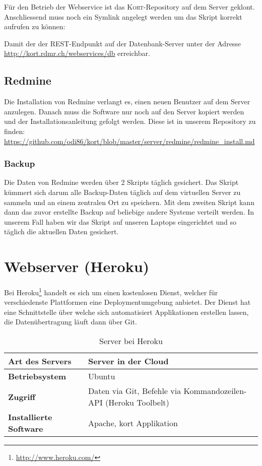 Für den Betrieb der Webservice ist das \textsc{Kort}-Repository auf dem Server geklont.
Anschliessend muss noch ein Symlink angelegt werden um das Skript korrekt aufrufen zu können:


Damit der der REST-Endpunkt auf der Datenbank-Server unter der Adresse \url{http://kort.rdmr.ch/webservices/db} erreichbar.

\subsection{Redmine}
Die Installation von Redmine verlangt es, einen neuen Benutzer  auf dem Server anzulegen.
Danach muss die Software nur noch auf den Server kopiert werden und der Installationsanleitung gefolgt werden.
Diese ist in unserem Repository zu finden: \url{https://github.com/odi86/kort/blob/master/server/redmine/redmine_install.md}

\subsubsection{Backup}
Die Daten von Redmine werden über 2 Skripts täglich gesichert. 
Das Skript  kümmert sich darum alle Backup-Daten täglich auf dem virtuellen Server zu sammeln und an einem zentralen Ort zu speichern.
Mit dem zweiten Skript  kann dann das zuvor erstellte Backup auf beliebige andere Systeme verteilt werden.
In unserem Fall haben wir das Skript auf unseren Laptops eingerichtet und so täglich die aktuellen Daten gesichert.


\section{Webserver (Heroku)}

Bei Heroku\footnote{\url{http://www.heroku.com/}} handelt es sich um einen kostenlosen Dienst, welcher für verschiedenste Plattformen eine Deploymentumgebung anbietet. 
Der Dienst hat eine Schnittstelle über welche sich automatisiert Applikationen erstellen lassen, die Datenübertragung läuft dann über \gls{Git}.

\begin{table}[H]
\centering
\begin{tabular}{|p{0.25\twocelltabwidth}|p{0.75\twocelltabwidth}|}
\hline 
\small{\textbf{Art des Servers}} & Server in der \gls{Cloud} \\
\hline 
\small{\textbf{Betriebsystem}} & Ubuntu \\
\hline 
\small{\textbf{Zugriff}} & Daten via \gls{Git}, Befehle via Kommandozeilen-API (Heroku Toolbelt) \\
\hline 
\small{\textbf{Installierte Software}} & Apache, kort Applikation \\
\hline 
\end{tabular} 
\caption{Server bei Heroku}
\label{infrastruktur-heroku-tabelle}
\end{table}


